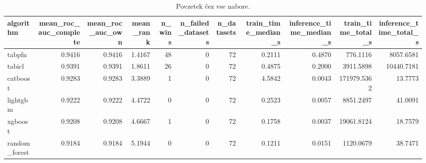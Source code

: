 \begin{table}[htbp]
\centering
\caption{Povzetek čez vse nabore.}
\label{tab:overall}
\begin{tabular}{lrrrrrrrrrr}
\hline
algorithm & mean\_roc\_auc\_complete & mean\_roc\_auc\_own & mean\_rank & n\_wins & n\_failed\_datasets & n\_datasets & train\_time\_median\_s & inference\_time\_median\_s & train\_time\_total\_s & inference\_time\_total\_s \\
\hline
tabpfn & 0.9416 & 0.9416 & 1.4167 & 48 & 0 & 72 & 0.2111 & 0.4870 & 776.1116 & 8057.6581 \\
tabicl & 0.9391 & 0.9391 & 1.8611 & 26 & 0 & 72 & 0.4875 & 0.2000 & 3911.5898 & 10440.7181 \\
catboost & 0.9283 & 0.9283 & 3.3889 & 1 & 0 & 72 & 4.5842 & 0.0043 & 171979.5362 & 13.7773 \\
lightgbm & 0.9222 & 0.9222 & 4.4722 & 0 & 0 & 72 & 0.2523 & 0.0057 & 8851.2497 & 41.0091 \\
xgboost & 0.9208 & 0.9208 & 4.6667 & 1 & 0 & 72 & 0.1758 & 0.0037 & 19061.8124 & 18.7579 \\
random\_forest & 0.9184 & 0.9184 & 5.1944 & 0 & 0 & 72 & 0.1211 & 0.0151 & 1120.0679 & 38.7471 \\
\hline
\end{tabular}
\end{table}

